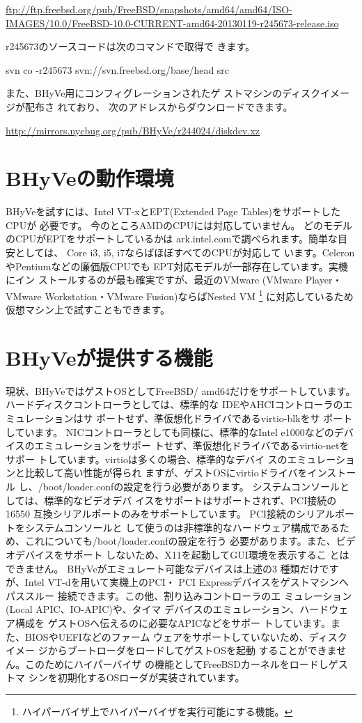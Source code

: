 \url{ftp://ftp.freebsd.org/pub/FreeBSD/snapshots/amd64/amd64/ISO-IMAGES/10.0/FreeBSD-10.0-CURRENT-amd64-20130119-r245673-release.iso}

 r245673のソースコードは次のコマンドで取得で
きます。

svn co -r245673 svn://svn.freebsd.org/base/head src

 また、BHyVe用にコンフィグレーションされたゲ
ストマシンのディスクイメージが配布さ れており、
次のアドレスからダウンロードできます。

\url{http://mirrors.nycbug.org/pub/BHyVe/r244024/diskdev.xz}


\section{BHyVeの動作環境}

 BHyVeを試すには、Intel VT-xとEPT(Extended
Page Tables)をサポートしたCPUが 必要です。
 今のところAMDのCPUには対応していません。
どのモデルのCPUがEPTをサポートしているかは
ark.intel.comで調べられます。簡単な目安としては、
Core i3, i5, i7ならばほぼすべてのCPUが対応して
います。CeleronやPentiumなどの廉価版CPUでも
EPT対応モデルが一部存在しています。実機にイン
ストールするのが最も確実ですが、最近のVMware
(VMware Player・VMware Workstation・VMware
Fusion)ならばNested VM
\footnote{ハイパーバイザ上でハイパーバイザを実行可能にする機能。}
に対応しているため仮想マシン上で試すこともできます。

\section{BHyVeが提供する機能}

 現状、BHyVeではゲストOSとしてFreeBSD/
amd64だけをサポートしています。
 ハードディスクコントローラとしては、標準的な
IDEやAHCIコントローラのエミュレーションはサ
ポートせず、準仮想化ドライバであるvirtio-blkをサ
ポートしています。
 NICコントローラとしても同様に、標準的なIntel
e1000などのデバイスのエミュレーションをサポー
トせず、準仮想化ドライバであるvirtio-netをサポー
トしています。virtioは多くの場合、標準的なデバイ
スのエミュレーションと比較して高い性能が得られ
ますが、ゲストOSにvirtioドライバをインストール
し、/boot/loader.confの設定を行う必要があります。
システムコンソールとしては、標準的なビデオデバ
イスをサポートはサポートされず、PCI接続の16550
互換シリアルポートのみをサポートしています。
PCI接続のシリアルポートをシステムコンソールと
して使うのは非標準的なハードウェア構成であるた
め、これについても/boot/loader.confの設定を行う
必要があります。また、ビデオデバイスをサポート
しないため、X11を起動してGUI環境を表示するこ
とはできません。
 BHyVeがエミュレート可能なデバイスは上述の3
種類だけですが、Intel VT-dを用いて実機上のPCI・
PCI Expressデバイスをゲストマシンへパススルー
接続できます。この他、割り込みコントローラのエ
ミュレーション(Local APIC、IO-APIC)や、タイマ
デバイスのエミュレーション、ハードウェア構成を
ゲストOSへ伝えるのに必要なAPICなどをサポー
トしています。また、BIOSやUEFIなどのファーム
ウェアをサポートしていないため、ディスクイメー
ジからブートローダをロードしてゲストOSを起動
することができません。このためにハイパーバイザ
の機能としてFreeBSDカーネルをロードしゲストマ
シンを初期化するOSローダが実装されています。


